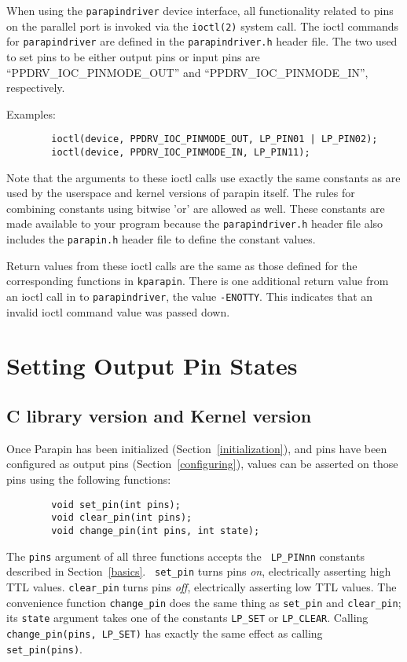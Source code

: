 \documentclass{article}
\begin{document}
When using the {\tt parapindriver} device interface, all functionality 
related to pins on the parallel port is invoked via the
{\tt ioctl(2)} system
call.  The ioctl commands for {\tt parapindriver} are defined in the
{\tt parapindriver.h} header file.  The two used to set pins to be
either output pins or input pins are ``PPDRV\_IOC\_PINMODE\_OUT'' and
``PPDRV\_IOC\_PINMODE\_IN'', respectively. 

Examples:
\begin {verbatim}
        ioctl(device, PPDRV_IOC_PINMODE_OUT, LP_PIN01 | LP_PIN02);
        ioctl(device, PPDRV_IOC_PINMODE_IN, LP_PIN11);
\end{verbatim}

Note that the arguments to these ioctl calls use exactly the same
constants as are used by the userspace and kernel versions of parapin itself.
The rules for combining constants using bitwise 'or' are allowed as well.
These constants are made available to your program because the
{\tt parapindriver.h} header file also includes the {\tt parapin.h}
header file to define the constant values.

Return values from these ioctl calls are the same as those defined for
the corresponding functions in {\tt kparapin}.  There is one additional
return value from an ioctl call in to {\tt parapindriver}, the value
{\tt -ENOTTY}.  This indicates that an invalid ioctl command value was
passed down.


\section{Setting Output Pin States}
\label{setandclear}

\subsection{C library version and Kernel version}

Once Parapin has been initialized (Section~\ref{initialization}), and
pins have been configured as output pins (Section~\ref{configuring}),
values can be asserted on those pins using the following functions:
\begin{verbatim}
        void set_pin(int pins);
        void clear_pin(int pins);
        void change_pin(int pins, int state);
\end{verbatim}

The {\tt pins} argument of all three functions accepts the {\tt
LP\_PINnn} constants described in Section~\ref{basics}.  {\tt
set\_pin} turns pins {\em on}, electrically asserting high TTL values.
{\tt clear\_pin} turns pins {\em off}, electrically asserting low TTL
values.  The convenience function {\tt change\_pin} does the same
thing as {\tt set\_pin} and {\tt clear\_pin}; its {\tt state} argument
takes one of the constants {\tt LP\_SET} or {\tt LP\_CLEAR}.
Calling {\tt change\_pin(pins, LP\_SET)} has exactly the same effect
as calling {\tt set\_pin(pins)}.
\end{document}
